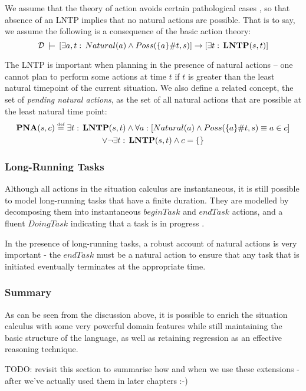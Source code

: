 We assume that the theory of action avoids certain pathological cases
\citep{reiter01kia}, so that absence of an LNTP implies that no natural
actions are possible. That is to say, we assume the following is a
consequence of the basic action theory:\[
\mathcal{D}\,\models\,\left[\exists a,t:\, Natural(a)\wedge Poss(\{a\}\#t,s)\right]\rightarrow\left[\exists t:\,\mathbf{LNTP}(s,t)\right]\]


The LNTP is important when planning in the presence of natural actions
-- one cannot plan to perform some actions at time $t$ if $t$ is
greater than the least natural timepoint of the current situation.
We also define a related concept, the set of \emph{pending natural
actions}, as the set of all natural actions that are possible at the
least natural time point:\begin{multline*}
\mathbf{PNA}(s,c)\stackrel{\mbox{\tiny def}}{=}\exists t:\,\mathbf{LNTP}(s,t)\wedge\forall a:\left[Natural(a)\wedge Poss(\{a\}\#t,s)\equiv a\in c\right]\\
\vee\neg\exists t:\,\mathbf{LNTP}(s,t)\wedge c=\{\}\end{multline*}



\subsubsection{Long-Running Tasks}

Although all actions in the situation calculus are instantaneous,
it is still possible to model long-running tasks that have a finite
duration. They are modelled by decomposing them into instantaneous
$beginTask$ and $endTask$ actions, and a fluent $DoingTask$ indicating
that a task is in progress \citep{pinto94temporal}.

In the presence of long-running tasks, a robust account of natural
actions is very important - the $endTask$ must be a natural action
to ensure that any task that is initiated eventually terminates at
the appropriate time.


\subsubsection{Summary}

As can be seen from the discussion above, it is possible to enrich
the situation calculus with some very powerful domain features while
still maintaining the basic structure of the language, as well as
retaining regression as an effective reasoning technique.

TODO: revisit this section to summarise how and when we use these
extensions - after we've actually used them in later chapters :-)


